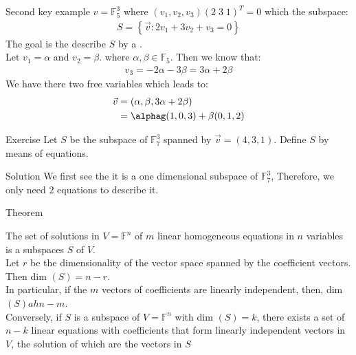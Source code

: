 \begin{parag}{Second key example}
    $v = \mathbb{F}_5^3$ where $\left(v_1, v_2, v_3\right)\left(2\; 3\; 1\right)^T = 0$ which the subspace:
    \begin{align*}
        S =  \left\{\vec{v}: 2v_1 + 3v_2 + v_3 = 0\right\}
    \end{align*}
    The goal is the describe $S$ by a .\\
    Let $v_1 = \alpha$ and $v_2 =  \beta$. where $\alpha, \beta \in \mathbb{F}_5$. Then we know that:
    \begin{align*} v_3 =  -2\alpha - 3\beta =  3\alpha + 2\beta \end{align*}
    We have there two free variables which leads to:
    \begin{align*} 
        \vec{v} &= \left(\alpha, \beta, 3\alpha + 2\beta\right)\\
                &= \alphag \left(1, 0, 3\right) + \beta\left(0, 1, 2\right)
    \end{align*}
\end{parag}
\begin{parag}{Exercise}
    Let $S$ be the subspace of $\mathbb{F}_7^3$ spanned by $\vec{v} =  \left(4, 3, 1\right)$. Define $S$ by means of equations.
\end{parag}
\begin{parag}{Solution}
    We first see the it is a one dimensional subspace of $\mathbb{F}_7^3$, Therefore, we only need $2$ equations to describe it.\\

\end{parag}
\begin{parag}{Theorem}
    \begin{theoreme}
    The set of solutions in $V = \mathbb{F}^n$ of $m$ linear homogeneous equations in $n$ variables is a subspaces $S$ of $V$.\\
    Let $r$ be the dimensionality of the vector space spanned by the coefficient vectors. Then dim $\left(S\right) =  n-r$.\\
    In particular, if the $m$ vectors of coefficients are linearly independent, then, dim $\left(S\right) ah n-m$.\\
    Conversely, if $S$ is a subspace  of $V =  \mathbb{F}^n$ with dim $\left(S\right) = k$, there exists a set of $n-k$ linear equations with coefficients that form linearly independent vectors in $V$, the solution of which are the vectors in $S$
    \end{theoreme}
\end{parag}


